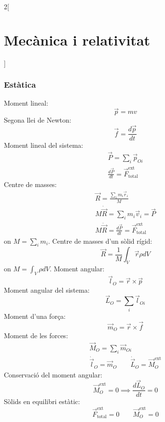 \documentclass[class=article,10pt,crop=false]{standalone}
\begin{document}
\begin{multicols}{2}[\section{Mecànica i relativitat}]
\subsubsection{Estàtica}
Moment lineal: $$\Vec{p}=mv$$
Segona llei de Newton: $$\Vec{f}=\frac{d\Vec{p}}{dt}$$
Moment lineal del sistema:
\begin{gather*}
    \Vec{P}=\sum_i\Vec{p}_{Oi}\\
    \frac{d\Vec{P}}{dt}=\Vec{F}_\text{total}^\text{ext}
\end{gather*}
Centre de masses: 
\begin{gather*}
\Vec{R}=\frac{\sum_im_i\Vec{r}_i}{M}\\
M\dot{\Vec{R}}=\sum_im_i\Vec{v}_i=\Vec{P}\\
M\ddot{\Vec{R}}=\frac{d\Vec{P}}{dt}=\Vec{F}_\text{total}^\text{ext}
\end{gather*}{on $M=\sum_i m_i$.}\newline
Centre de masses d'un sòlid rígid: $$\Vec{R}=\frac{1}{M}\int_V\Vec{r}\rho dV$$ {on $M=\int_V\rho dV$.}\newline
Moment angular: $$\Vec{l}_O=\Vec{r}\times\Vec{p}$$
Moment angular del sistema: $$\Vec{L}_O=\sum_i\Vec{l}_{Oi}$$
Moment d'una força: $$\Vec{m}_O=\Vec{r}\times\Vec{f}$$
Moment de les forces: 
\begin{gather*}
    \Vec{M}_O=\sum_i\Vec{m}_{Oi}\\
\dot{\Vec{l}}_O=\Vec{m}_O\qquad\dot{\Vec{L}}_O=\Vec{M}_O^\text{ext}
\end{gather*}
Conservació del moment angular: $$\Vec{M}_O^\text{ext}=0\implies\frac{d\Vec{L}_O}{dt}=0$$
Sòlids en equilibri estàtic: $$\Vec{F}_\text{total}^\text{ext}=0\qquad\Vec{M}_O^\text{ext}=0$$

\end{multicols}
\end{document}
